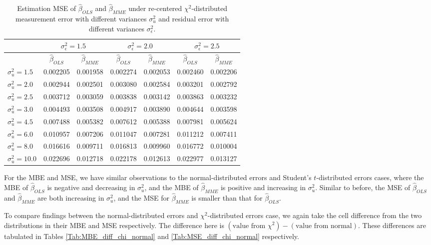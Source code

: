 \documentclass{article}
\begin{document}
\begin{table}[ht]
    \centering
    \caption{Estimation MSE of $\hat{\beta}_{OLS}$ and $\hat{\beta}_{MME}$ under re-centered $\chi^2$-distributed measurement error with different variances $\sigma^2_u$ and residual error with different variances $\sigma^2_\epsilon$.}
    \label{Tab:MSE_chi}
    \begin{tabular}[t]{lcccccc}
        \hline
        &\multicolumn{2}{c}{$\sigma^2_\epsilon=1.5$}&\multicolumn{2}{c}{$\sigma^2_\epsilon=2.0$}&\multicolumn{2}{c}{$\sigma^2_\epsilon=2.5$}\\
        \hline
        &$\hat{\beta}_{OLS}$&$\hat{\beta}_{MME}$&$\hat{\beta}_{OLS}$&$\hat{\beta}_{MME}$&$\hat{\beta}_{OLS}$&$\hat{\beta}_{MME}$\\
        \hline
        $\sigma^2_u = 1.5$&0.002205&0.001958&0.002274&0.002053&0.002460&0.002206\\
        $\sigma^2_u = 2.0$&0.002944&0.002501&0.003080&0.002584&0.003201&0.002792\\
        $\sigma^2_u = 2.5$&0.003712&0.003059&0.003838&0.003142&0.003863&0.003232\\
        $\sigma^2_u = 3.0$&0.004493&0.003508&0.004917&0.003890&0.004644&0.003598\\
        $\sigma^2_u = 4.5$&0.007488&0.005382&0.007612&0.005388&0.007981&0.005624\\
        $\sigma^2_u = 6.0$&0.010957&0.007206&0.011047&0.007281&0.011212&0.007411\\
        $\sigma^2_u = 8.0$&0.016616&0.009711&0.016813&0.009960&0.016772&0.010004\\
        $\sigma^2_u = 10.0$&0.022696&0.012718&0.022178&0.012613&0.022977&0.013127\\
        \hline
    \end{tabular}
\end{table}

For the MBE and MSE, we have similar observations to the normal-distributed errors and Student's $t$-distributed errors cases,
where the MBE of $\hat{\beta}_{OLS}$ is negative and decreasing in $\sigma^2_u$, 
and the MBE of $\hat{\beta}_{MME}$ is positive and increasing in $\sigma^2_u$.
Similar to before, the MSE of $\hat{\beta}_{OLS}$ and $\hat{\beta}_{MME}$ are both increasing in $\sigma^2_u$,
and the MSE for $\hat{\beta}_{MME}$ is smaller than that for $\hat{\beta}_{OLS}$.

To compare findings between the normal-distributed errors and $\chi^2$-distributed errors case,
we again take the cell difference from the two distributions in their MBE and MSE respectively.
The difference here is $(\textrm{value from } \chi^2) - (\textrm{value from normal})$. 
These differences are tabulated in Tables \ref{Tab:MBE_diff_chi_normal} and \ref{Tab:MSE_diff_chi_normal} respectively.
\end{document}

